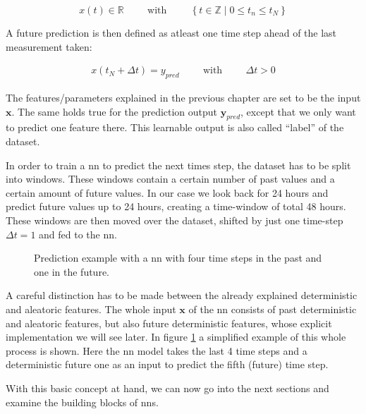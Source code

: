 \begin{equation}
x(t) \in \mathbb{R} \hspace{1cm} \text{with} \hspace{1cm} \left\{t \in \mathbb{Z} \mid 0 \leq t_n \leq t_N\right\}
\end{equation} 

A future prediction is then defined as atleast one time step ahead of the last measurement taken:

\begin{align*}
x(t_N + \Delta t) = y_{pred} \hspace{1cm} \text{with} \hspace{1cm} \Delta t > 0
\end{align*}

The features/parameters explained in the previous chapter are set to be the input $\mathbf{x}$. The same holds true for the prediction output $\mathbf{y}_{pred}$, except that we only want to predict one feature there. This learnable output is also called \enquote{label} of the dataset.

In order to train a \ac{nn} to predict the next times step, the dataset has to be split into windows. These windows contain a certain number of past values and a certain amount of future values. In our case we look back for 24 hours and predict future values up to 24 hours, creating a time-window of total 48 hours. These windows are then moved over the dataset, shifted by just one time-step $\Delta t = 1$ and fed to the \ac{nn}.

\begin{figure}[htb]
\centering

\caption{Prediction example with a \ac{nn} with four time steps in the past and one in the future.}
\label{f:simple_prediction}
\end{figure}

A careful distinction has to be made between the already explained deterministic and aleatoric features. The whole input $\mathbf{x}$ of the \ac{nn} consists of past deterministic and aleatoric features, but also future deterministic features, whose explicit implementation we will see later. \newline
In figure \ref{f:simple_prediction} a simplified example of this whole process is shown. Here the \ac{nn} model takes the last 4 time steps and a deterministic future one as an input to predict the fifth (future) time step.

With this basic concept at hand, we can now go into the next sections and examine the building blocks of \acp{nn}.

